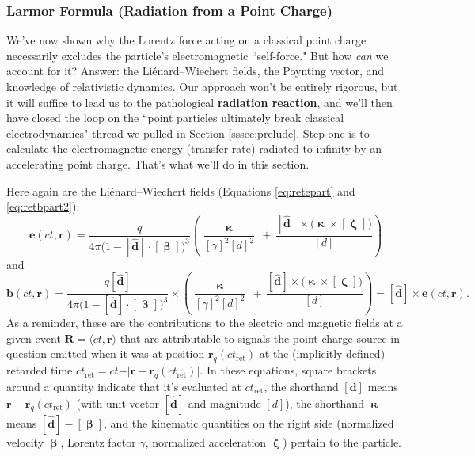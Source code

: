 \documentclass[12pt]{article}
\renewcommand{\vv}[1]{\mathbf{#1}}
\newcommand{\vvbeta}{\bm{\upbeta}}
\newcommand{\vvzeta}{\bm{\upzeta}}
\begin{document}
\subsubsection{Larmor Formula (Radiation from a Point Charge)}\label{sssec:larmor}

We've now shown why the Lorentz force acting on a classical point charge necessarily excludes the particle's electromagnetic ``self-force." But how \emph{can} we account for it? Answer: the Li\'enard--Wiechert fields, the Poynting vector, and knowledge of relativistic dynamics. Our approach won't be entirely rigorous, but it will suffice to lead us to the pathological \textbf{radiation reaction}, and we'll then have closed the loop on the ``point particles ultimately break classical electrodynamics" thread we pulled in Section \ref{sssec:prelude}. Step one is to calculate the electromagnetic energy (transfer rate) radiated to infinity by an accelerating point charge. That's what we'll do in this section.

Here again are the Li\'enard--Wiechert fields (Equations \ref{eq:retepart} and \ref{eq:retbpart2}):
\begin{equation*}
\vv e(ct, \vv r) = \dfrac{q}{4 \pi \big( 1 - [\vv{\hat{d}}] \cdot [\vvbeta] \big)^3} \left( \dfrac{\vv{\upkappa}}{[\gamma]^2 [d]^2} \, + \, \dfrac{[\vv{\hat{d}}] \times \big( \vv{\upkappa} \times [\vvzeta] \big)}{[d]} \right)
\end{equation*}
and
\begin{equation*}
\vv b (ct, \vv r) = \dfrac{q [\vv{\hat{d}}]}{4 \pi \big( 1 - [\vv{\hat{d}}] \cdot [\vvbeta] \big)^3} \times \left( \dfrac{\vv{\upkappa}}{[\gamma]^2 [d]^2} \, + \, \dfrac{[\vv{\hat{d}}] \times \big( \vv{\upkappa} \times [\vvzeta] \big)}{[d]} \right) = [\vv{\hat{d}}] \times \vv e (ct, \vv r).
\end{equation*}
As a reminder, these are the contributions to the electric and magnetic fields at a given event $\vv R = \langle ct, \vv r \rangle$ that are attributable to signals the point-charge source in question emitted when it was at position $\vv r_{q}(ct_{\mathrm{ret}})$ at the (implicitly defined) retarded time $ct_{\mathrm{ret}} = ct - \vert \vv r - \vv r_{q}(ct_{\mathrm{ret}}) \vert$. In these equations, square brackets around a quantity indicate that it's evaluated at $ct_{\mathrm{ret}}$, the shorthand $[\vv{d}]$ means $\vv r - \vv r_{q}(ct_{\mathrm{ret}})$ (with unit vector $[\vv{\hat{d}}]$ and magnitude $[d]$), the shorthand $\vv{\upkappa}$ means $[\vv{\hat{d}}] - [\vvbeta]$, and the kinematic quantities on the right side (normalized velocity $\vvbeta$, Lorentz factor $\gamma$, normalized acceleration $\vvzeta$) pertain to the particle.
\end{document}
